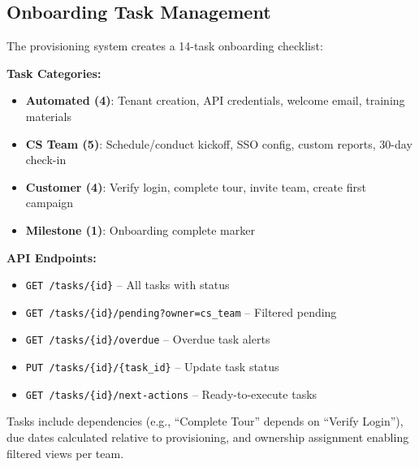 \documentclass[8pt,a4paper]{article}
\begin{document}
\vspace{0.15em}
\subsection{Onboarding Task Management}

\vspace{0.05em}
{\scriptsize
The provisioning system creates a 14-task onboarding checklist:

\vspace{0.1em}
\begin{minipage}[t]{0.48\textwidth}
\textbf{Task Categories:}
\begin{itemize}[leftmargin=1.2em]
\item \textbf{Automated (4)}: Tenant creation, API credentials, welcome email, training materials
\item \textbf{CS Team (5)}: Schedule/conduct kickoff, SSO config, custom reports, 30-day check-in
\item \textbf{Customer (4)}: Verify login, complete tour, invite team, create first campaign
\item \textbf{Milestone (1)}: Onboarding complete marker
\end{itemize}
\end{minipage}
\hfill
\begin{minipage}[t]{0.48\textwidth}
\textbf{API Endpoints:}
\begin{itemize}[leftmargin=1.2em]
\item \texttt{GET /tasks/\{id\}} -- All tasks with status
\item \texttt{GET /tasks/\{id\}/pending?owner=cs\_team} -- Filtered pending
\item \texttt{GET /tasks/\{id\}/overdue} -- Overdue task alerts
\item \texttt{PUT /tasks/\{id\}/\{task\_id\}} -- Update task status
\item \texttt{GET /tasks/\{id\}/next-actions} -- Ready-to-execute tasks
\end{itemize}
\end{minipage}

\vspace{0.1em}
Tasks include dependencies (e.g., ``Complete Tour'' depends on ``Verify Login''), due dates calculated relative to provisioning, and ownership assignment enabling filtered views per team.
}

\vspace{0.1em}
\end{document}
